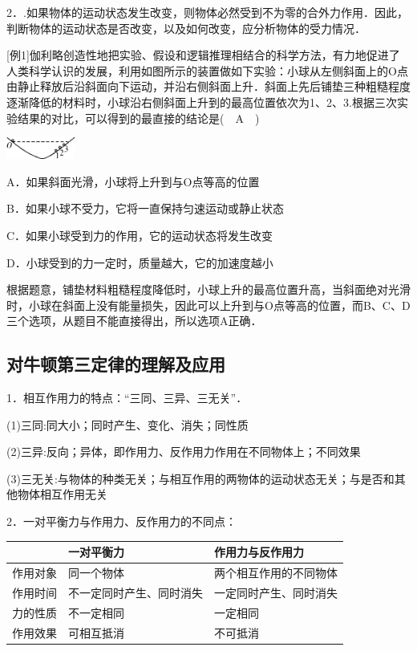 2．.如果物体的运动状态发生改变，则物体必然受到不为零的合外力作用．因此，判断物体的运动状态是否改变，以及如何改变，应分析物体的受力情况．

{[}例1{]}伽利略创造性地把实验、假设和逻辑推理相结合的科学方法，有力地促进了人类科学认识的发展，利用如图所示的装置做如下实验：小球从左侧斜面上的O点由静止释放后沿斜面向下运动，并沿右侧斜面上升．斜面上先后铺垫三种粗糙程度逐渐降低的材料时，小球沿右侧斜面上升到的最高位置依次为1、2、3.根据三次实验结果的对比，可以得到的最直接的结论是(　A　)

\begin{center}\includegraphics[width=0.88542in,height=0.28125in]{media/image95.png}\end{center}

A．如果斜面光滑，小球将上升到与O点等高的位置

B．如果小球不受力，它将一直保持匀速运动或静止状态

C．如果小球受到力的作用，它的运动状态将发生改变

D．小球受到的力一定时，质量越大，它的加速度越小
\begin{solution}
	根据题意，铺垫材料粗糙程度降低时，小球上升的最高位置升高，当斜面绝对光滑时，小球在斜面上没有能量损失，因此可以上升到与O点等高的位置，而B、C、D三个选项，从题目不能直接得出，所以选项A正确．
\end{solution}


\subsection{对牛顿第三定律的理解及应用}

1．相互作用力的特点：``三同、三异、三无关''．

(1)三同:同大小；同时产生、变化、消失；同性质

(2)三异:反向；异体，即作用力、反作用力作用在不同物体上；不同效果

(3)三无关:与物体的种类无关；与相互作用的两物体的运动状态无关；与是否和其他物体相互作用无关

2．一对平衡力与作用力、反作用力的不同点：

\begin{longtable}[]{@{}lll@{}}
\toprule


  & \begin{minipage}[b]{0.30\columnwidth}\raggedright
一对平衡力\strut
\end{minipage} & \begin{minipage}[b]{0.30\columnwidth}\raggedright
作用力与反作用力\strut
\end{minipage}\tabularnewline
\midrule
\endhead
作用对象 & 同一个物体 & 两个相互作用的不同物体\tabularnewline
作用时间 & 不一定同时产生、同时消失 &
一定同时产生、同时消失\tabularnewline
力的性质 & 不一定相同 & 一定相同\tabularnewline
作用效果 & 可相互抵消 & 不可抵消\tabularnewline
\bottomrule
\end{longtable}



